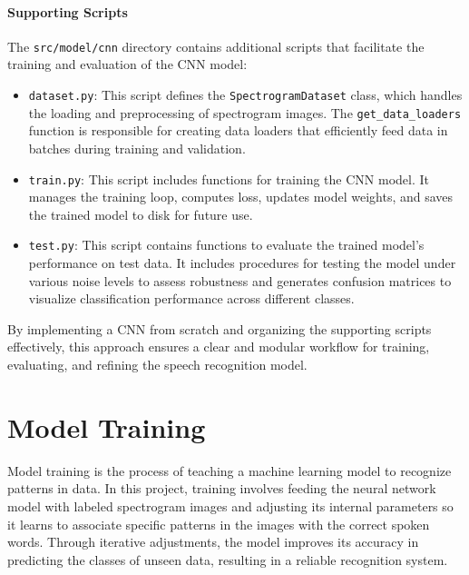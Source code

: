 \documentclass[12pt]{article}
\begin{document}
\paragraph{Supporting Scripts}

The \texttt{src/model/cnn} directory contains additional scripts that facilitate the training and evaluation of the CNN model:

\begin{itemize}
    \item \texttt{dataset.py}: This script defines the \texttt{SpectrogramDataset} class, which handles the loading and preprocessing of spectrogram images. The \texttt{get\_data\_loaders} function is responsible for creating data loaders that efficiently feed data in batches during training and validation.
    
    \item \texttt{train.py}: This script includes functions for training the CNN model. It manages the training loop, computes loss, updates model weights, and saves the trained model to disk for future use.
    
    \item \texttt{test.py}: This script contains functions to evaluate the trained model's performance on test data. It includes procedures for testing the model under various noise levels to assess robustness and generates confusion matrices to visualize classification performance across different classes.
\end{itemize}

By implementing a CNN from scratch and organizing the supporting scripts effectively, this approach ensures a clear and modular workflow for training, evaluating, and refining the speech recognition model.

\newpage




\section{Model Training}

Model training is the process of teaching a machine learning model to recognize patterns in data. In this project, training involves feeding the neural network model with labeled spectrogram images and adjusting its internal parameters so it learns to associate specific patterns in the images with the correct spoken words. Through iterative adjustments, the model improves its accuracy in predicting the classes of unseen data, resulting in a reliable recognition system.
\end{document}
